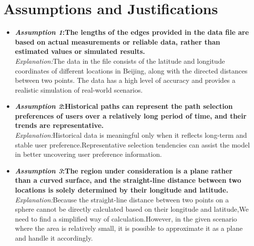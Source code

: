 \section{Assumptions and Justifications}
\begin{itemize}
\item \textbf{\textit{Assumption 1}:The lengths of the edges provided in the data file are based on actual measurements or reliable data, rather than estimated values or simulated results.}\\
\indent \textit{Explanation:}The data in the file consists of the latitude and longitude coordinates of different locations in Beijing, along with the directed distances between two points. The data has a high level of accuracy and provides a realistic simulation of real-world scenarios.
\item \textbf{\textit{Assumption 2}:Historical paths can represent the path selection preferences of users over a relatively long period of time, and their trends are representative.}\\
\indent \textit{Explanation:}Historical data is meaningful only when it reflects long-term and stable user preference.Representative selection tendencies can assist the model in better uncovering user preference information.
\item \textbf{\textit{Assumption 3}:The region under consideration is a plane rather than a curved surface, and the straight-line distance between two locations is solely determined by their longitude and latitude.}\\
\indent \textit{Explanation:}Because the straight-line distance between two points on a sphere cannot be directly calculated based on their longitude and latitude,We need to find a simplified way of calculation.However, in the given scenario where the area is relatively small, it is possible to approximate it as a plane and handle it accordingly.
\end{itemize}

